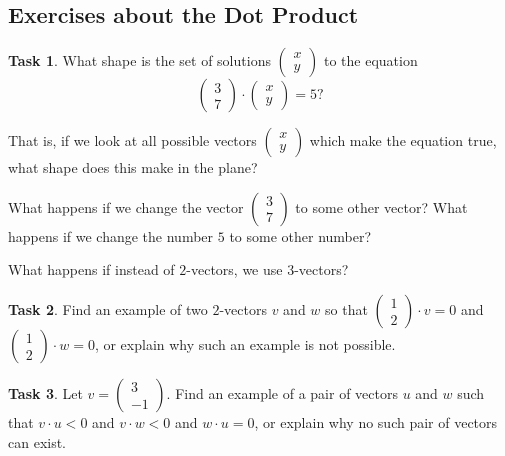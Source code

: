\documentclass[10pt,]{book}
\theoremstyle{plain}
\theoremstyle{definition}
\numberwithin{equation}{section}
\newtheorem{task}{Task}[chapter]
\begin{document}
\subsection[Exercises about the Dot Product]{Exercises about the Dot Product}\label{subsection-9}
\begin{task}
\label{task-13}
What shape is the set of solutions \(\left(\begin{smallmatrix} x \\ y
        \end{smallmatrix}\right)\) to the equation\[
            \begin{pmatrix} 3 \\ 7\end{pmatrix} \cdot \begin{pmatrix} x \\ y
            \end{pmatrix} = 5?
        \]
\par
That is, if we look at all possible vectors \(\left(\begin{smallmatrix}
          x \\ y \end{smallmatrix}\right)\) which make the equation true, what shape
          does this make in the plane?%
\par
What happens if we change the vector \(\left(\begin{smallmatrix} 3
          \\ 7 \end{smallmatrix}\right)\) to some other vector? What happens
          if we change the number \(5\) to some other number?
\par
What happens if instead of \(2\)-vectors, we use \(3\)-vectors?
\end{task}
\begin{task}
\label{task-14}
Find an example of two \(2\)-vectors \(v\) and \(w\)
      so that \(\left(\begin{smallmatrix}1 \\ 2 \end{smallmatrix}\right)\cdot v
      =0\) and \(\left(\begin{smallmatrix}1 \\ 2 \end{smallmatrix}\right)\cdot
      w = 0\), or explain why such an example is not possible.
      \end{task}
\begin{task}
\label{task-15}
Let \(v = \left(\begin{smallmatrix}3\\-1
        \end{smallmatrix}\right)\). Find an example of a pair of vectors
        \(u\) and \(w\) such that \(v \cdot u < 0\) and
        \(v \cdot w < 0\) and \(w \cdot u = 0\), or explain why no such
        pair of vectors can exist.
      \end{task}
\end{document}
